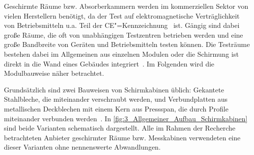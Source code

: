 

Geschirmte Räume bzw. Absorberkammern werden im kommerziellen Sektor von vielen Herstellern benötigt, da der Test auf elektromagnetische Verträglichkeit von Betriebsmitteln u.a. Teil der CE"=Kennzeichnung~\cite{Richtlinie_2014/30/EU} ist. Gängig sind dabei große Räume, die oft von unabhängigen Testzentren betrieben werden und eine große Bandbreite von Geräten und Betriebsmitteln testen können. Die Testräume bestehen dabei im Allgemeinen aus einzelnen Modulen oder die Schirmung ist direkt in die Wand eines Gebäudes integriert~\cite{EM_Schirmung}. Im Folgenden wird die Modulbauweise näher betrachtet.
\par
\vspace{\linespace}
Grundsätzlich sind zwei Bauweisen von Schirmkabinen üblich: Gekantete Stahlbleche, die miteinander verschraubt werden, und Verbundplatten aus metallischen Deckblechen mit einem Kern aus Pressspan, die durch Profile miteinander verbunden werden~\cite{EM_Schirmung, Design_of_shielded_enclosures}. In \Abb\ref{fig:3_Allgemeiner_Aufbau_Schirmkabinen} sind beide Varianten schematisch dargestellt. Alle im Rahmen der Recherche betrachteten Anbieter geschirmter Räume bzw. Messkabinen verwendeten eine dieser Varianten ohne nennenswerte Abwandlungen.

